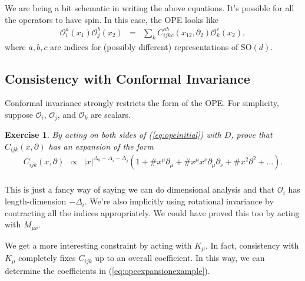 \documentclass[11pt]{ws-rv9x6}
\newcommand\be{\begin{eqnarray}}
\newcommand\ee{\end{eqnarray}}
\newcommand\cO{\mathcal{O}}
\newcommand\p[1]{\left(#1\right)}
\newcommand\ptl\partial
\newcommand\<\langle
\renewcommand\>\rangle
\newcommand\nn{\nonumber}
\renewcommand\.{\cdot}
\newcommand\SO{\mathrm{SO}}
\newcommand\De{\Delta}
\newtheorem{exercise}{Exercise}[section]
\begin{document}
We are being a bit schematic in writing the above equations.  It's possible for all the operators to have spin.  In this case, the OPE looks like
\be
\cO_i^a(x_1)\cO_j^b(x_2) &=& \sum_k C_{ijk}^{ab}{}_c(x_{12},\ptl_2)\cO_k^c(x_2),
\ee
where $a,b,c$ are indices for (possibly different) representations of $\SO(d)$.

\subsection{Consistency with Conformal Invariance}

Conformal invariance strongly restricts the form of the OPE\@.  For simplicity, suppose $\cO_i$, $\cO_j$, and $\cO_k$ are scalars.  
\begin{exercise}
By acting on both sides of (\ref{eq:opeinitial}) with $D$, prove that $C_{ijk}(x,\ptl)$ has an expansion of the form
\be
\label{eq:opeexpansionexample}
C_{ijk}(x,\ptl) &\propto& |x|^{\De_k-\De_i-\De_j}\p{1 +\# x^\mu\ptl_\mu + \# x^\mu x^\nu\ptl_\mu\ptl_\nu+\# x^2 \ptl^2 + \dots}.\nn\\
\ee
\end{exercise}
This is just a fancy way of saying we can do dimensional analysis and that $\cO_i$ has length-dimension $-\De_i$. We're also implicitly using rotational invariance by contracting all the indices appropriately. We could have proved this too by acting with $M_{\mu\nu}$.

We get a more interesting constraint by acting with $K_\mu$. In fact, consistency with $K_\mu$ completely fixes $C_{ijk}$ up to an overall coefficient. In this way, we can determine the coefficients in (\ref{eq:opeexpansionexample}).
\end{document}
